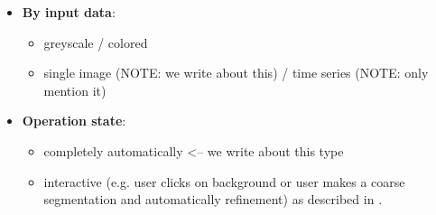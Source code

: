 \begin{itemize}
\begin{itemize}
        \end{itemize}
    \item \textbf{By input data}:
          \begin{itemize}
              \item greyscale / colored
              \item single image (NOTE: we write about this) / time series (NOTE: only mention it)
          \end{itemize}
    \item \textbf{Operation state}:
        \begin{itemize}
            \item completely automatically <-- we write about this type
            \item interactive (e.g. user clicks on background or user makes a
                  coarse segmentation and automatically refinement) as
                  described in
                  \cite{protiere2007interactive,rother2004grabcut}.
        \end{itemize}
\end{itemize}
